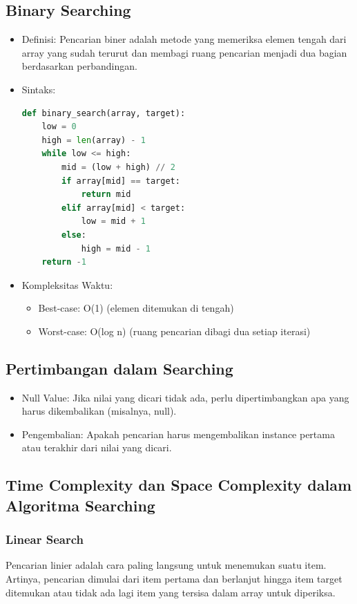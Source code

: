 \documentclass{article}
\begin{document}
\subsection{Binary Searching}
\begin{itemize}
    \item Definisi: Pencarian biner adalah metode yang memeriksa elemen tengah dari array yang sudah terurut dan membagi ruang pencarian menjadi dua bagian berdasarkan perbandingan.
    \item Sintaks:
          \begin{lstlisting}[language=Python, caption={}, captionpos=b]
def binary_search(array, target):
    low = 0
    high = len(array) - 1
    while low <= high:
        mid = (low + high) // 2
        if array[mid] == target:
            return mid
        elif array[mid] < target:
            low = mid + 1
        else:
            high = mid - 1
    return -1
\end{lstlisting}
    \item Kompleksitas Waktu:
          \begin{itemize}
              \item Best-case: O(1) (elemen ditemukan di tengah)
              \item Worst-case: O(log n) (ruang pencarian dibagi dua setiap iterasi)
          \end{itemize}
\end{itemize}

\subsection{Pertimbangan dalam Searching}
\begin{itemize}
    \item Null Value: Jika nilai yang dicari tidak ada, perlu dipertimbangkan apa yang harus dikembalikan (misalnya, null).
    \item Pengembalian: Apakah pencarian harus mengembalikan instance pertama atau terakhir dari nilai yang dicari.
\end{itemize}

\subsection{Time Complexity dan Space Complexity dalam Algoritma Searching}
\subsubsection{Linear Search}
Pencarian linier adalah cara paling langsung untuk menemukan suatu item. Artinya, pencarian dimulai dari item pertama dan berlanjut hingga item target ditemukan atau tidak ada lagi item yang tersisa dalam array untuk diperiksa.
\end{document}
